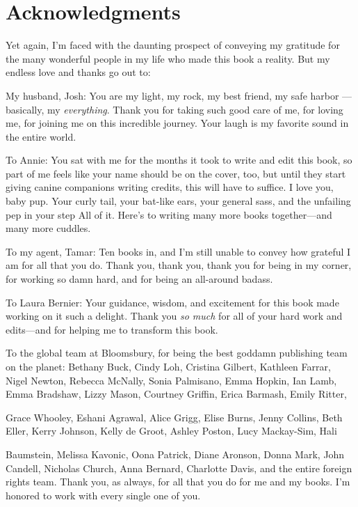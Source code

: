 
\chapter*{Acknowledgments}

Yet again, I'm faced with the daunting prospect of conveying my gratitude for the many wonderful people in my life who made this book a reality. But my endless love and thanks go out to:

My husband, Josh: You are my light, my rock, my best friend, my safe harbor ---basically, my \emph{everything}. Thank you for taking such good care of me, for loving me, for joining me on this incredible journey. Your laugh is my favorite sound in the entire world.

To Annie: You sat with me for the months it took to write and edit this book, so part of me feels like your name should be on the cover, too, but until they start giving canine companions writing credits, this will have to suffice. I love you, baby pup. Your curly tail, your bat-like ears, your general sass, and the unfailing pep in your step  All of it. Here's to writing many more books together---and many more cuddles.

To my agent, Tamar: Ten books in, and I'm still unable to convey how grateful I am for all that you do. Thank you, thank you, thank you for being in my corner, for working so damn hard, and for being an all-around badass.

To Laura Bernier: Your guidance, wisdom, and excitement for this book made working on it such a delight. Thank you \emph{so much} for all of your hard work and edits---and for helping me to transform this book.

To the global team at Bloomsbury, for being the best goddamn publishing team on the planet: Bethany Buck, Cindy Loh, Cristina Gilbert, Kathleen Farrar, Nigel Newton, Rebecca McNally, Sonia Palmisano, Emma Hopkin, Ian Lamb, Emma Bradshaw, Lizzy Mason, Courtney Griffin, Erica Barmash, Emily Ritter,

Grace Whooley, Eshani Agrawal, Alice Grigg, Elise Burns, Jenny Collins, Beth Eller, Kerry Johnson, Kelly de Groot, Ashley Poston, Lucy Mackay-Sim, Hali

Baumstein, Melissa Kavonic, Oona Patrick, Diane Aronson, Donna Mark, John Candell, Nicholas Church, Anna Bernard, Charlotte Davis, and the entire foreign rights team. Thank you, as always, for all that you do for me and my books. I'm honored to work with every single one of you.

